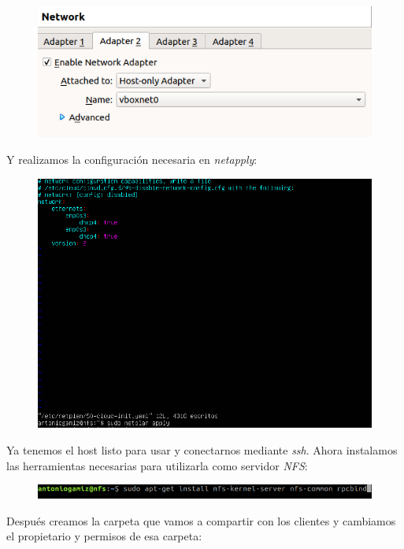 \documentclass[12pt]{article}
\begin{document}
\begin{figure}[H]
\center
\includegraphics[scale=0.4]{3.png}
\end{figure}

Y realizamos la configuración necesaria en \textit{netapply}:

\begin{figure}[H]
\center
\includegraphics[scale=0.4]{4.png}
\end{figure}

Ya tenemos el host listo para usar y conectarnos mediante \textit{ssh}. Ahora instalamos las herramientas necesarias para utilizarla como servidor \textit{NFS}:

\begin{figure}[H]
\center
\includegraphics[scale=0.4]{6.png}
\end{figure}

Después creamos la carpeta que vamos a compartir con los clientes y cambiamos el propietario y permisos de esa carpeta:
\end{document}
